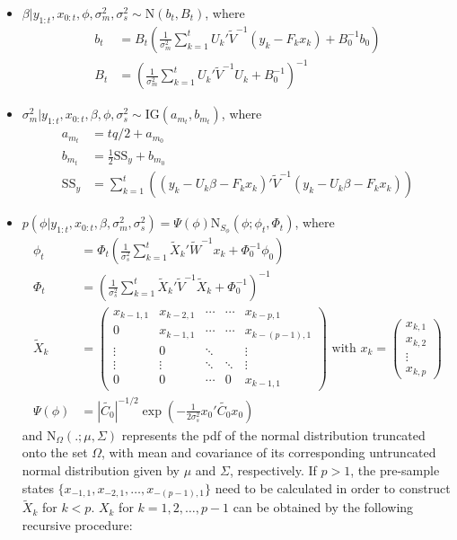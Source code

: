 \documentclass{article}
\begin{document}
\begin{itemize}
\item $\beta|y_{1:t},x_{0:t},\phi,\sigma^2_m,\sigma^2_s \sim \mbox{N}(b_t,B_t)$, where
\begin{align*}
b_t &= B_t\left(\frac{1}{\sigma^2_m} \sum^t_{k=1} U_k'\tilde{V}^{-1}(y_k - F_kx_k) + B_0^{-1}b_0\right) \\
B_t &= \left(\frac{1}{\sigma^2_m} \sum^t_{k=1} U_k'\tilde{V}^{-1}U_k + B_0^{-1}\right)^{-1}
\end{align*}
\item $\sigma^2_m|y_{1:t},x_{0:t},\beta,\phi,\sigma^2_s \sim \mbox{IG}(a_{m_t}, b_{m_t})$, where
\begin{align*}
a_{m_t} &= tq/2 + a_{m_0} \\
b_{m_t} &= \frac{1}{2}\mbox{SS}_y + b_{m_0} \\
\mbox{SS}_y &= \sum^t_{k=1} \left((y_k - U_k\beta - F_kx_k)'\tilde{V}^{-1}(y_k - U_k\beta - F_kx_k)\right)
\end{align*}
\item $p(\phi|y_{1:t},x_{0:t},\beta,\sigma^2_m,\sigma^2_s) = \Psi(\phi)\mbox{N}_{S_\phi}(\phi; \phi_t,\Phi_t)$, where
\begin{align*}
\phi_t &= \Phi_t\left(\frac{1}{\sigma^2_s} \sum^t_{k=1} \tilde{X}_k'\tilde{W}^{-1}x_k + \Phi_0^{-1}\phi_0\right) \\
\Phi_t &= \left(\frac{1}{\sigma^2_s} \sum^t_{k=1} \tilde{X}_k'\tilde{V}^{-1}\tilde{X}_k + \Phi_0^{-1}\right)^{-1} \\
\tilde{X}_k &= \left(\begin{array}{ccccc}
x_{k-1,1} & x_{k-2,1} & \cdots & \cdots & x_{k-p,1} \\
0 & x_{k-1,1} & \cdots & \cdots & x_{k-(p-1),1} \\
\vdots & 0 & \ddots & & \vdots \\
\vdots & \vdots & \ddots & \ddots & \vdots \\
0 & 0 & \cdots & 0 & x_{k-1,1}
\end{array}
\right) \mbox{ with } x_k = \left(\begin{array}{c} x_{k,1} \\ x_{k,2} \\ \vdots \\ x_{k,p} \end{array}\right)\\
\Psi(\phi) &= \left|\tilde{C_0}\right|^{-1/2}\exp\left(-\frac{1}{2\sigma^2_s}x_0'\tilde{C_0}x_0\right)
\end{align*}
\noindent and $\mbox{N}_{\Omega}(.;\mu,\Sigma)$ represents the pdf of the normal distribution truncated onto the set $\Omega$, with mean and covariance of its corresponding untruncated normal distribution given by $\mu$ and $\Sigma$, respectively. If $p > 1$, the pre-sample states $\{x_{-1,1}, x_{-2,1}, \ldots, x_{-(p-1),1}\}$ need to be calculated in order to construct $\tilde{X}_k$ for $k < p$. $X_k$ for $k = 1,2,\ldots,p-1$ can be obtained by the following recursive procedure: \\

\end{itemize}
\end{document}
